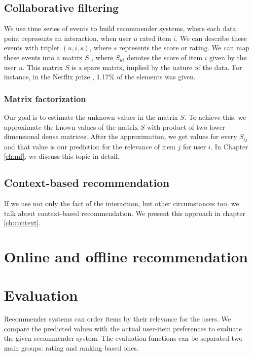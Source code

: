 \subsection{Collaborative filtering}\label{subsec:collab}
We use time series of events to build recommender systems, where each data point 
represents an interaction, when user $u$ rated item $i$. We can describe these events 
with triplet $(u, i, s)$, where $s$ represents the score or rating. We  can map these
events into a matrix $S$ , where $S_{ui}$ denotes the  score of item $i$ given by the
user $u$. This matrix $S$ is a spare matrix, implied by the nature of the data. For 
instance, in the Netflix prize \cite{bennett2007netflix}, 1.17\% of the elements was given. 


\subsubsection{Matrix factorization}\label{subsec:mf}
Our goal is to estimate the unknown values in the matrix $S$. To achieve this, we
approximate the known values of the matrix $S$ with product of two lower dimensional
dense matrices. After the approximation, we get values for every $S_{ij}$ and that 
value is our prediction for the relevance of item $j$ for user $i$. In Chapter \ref{ch:mf}, we
discuss this topic in detail.
 
\subsection{Context-based recommendation}\label{subsec:context}
If we use not only the fact of the interaction, but other circumstances too, we talk about 
context-based recommendation. We present this approach in chapter \ref{ch:context}.

\section{Online and offline recommendation}

\section{Evaluation}\label{sec:eval}
Recommender systems can order items by their relevance for the users. We compare the
predicted values with the actual user-item preferences to evaluate the given recommender
system. The evaluation functions can be separated two main groups: rating and ranking  based ones.

